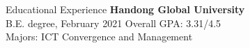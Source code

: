 \documentclass{resume} %
\begin{document}

\begin{rSection}{Educational Experience}
{\bf Handong Global University} \hfill 
\\  B.E. degree, February 2021 \hfill { Overall GPA: 3.31/4.5}
\\ Majors: ICT Convergence and Management


\end{rSection}
\end{document}
